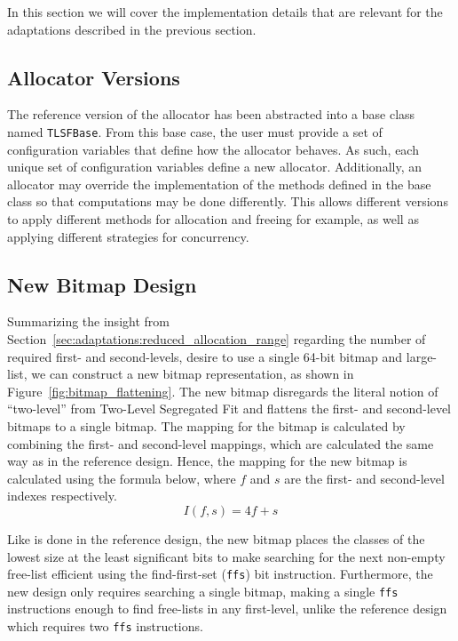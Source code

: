 
In this section we will cover the implementation details that are relevant for the adaptations described in the previous section.

\subsection{Allocator Versions}

The reference version of the allocator has been abstracted into a base class named \texttt{TLSFBase}. From this base case, the user must provide a set of configuration variables that define how the allocator behaves. As such, each unique set of configuration variables define a new allocator. Additionally, an allocator may override the implementation of the methods defined in the base class so that computations may be done differently. This allows different versions to apply different methods for allocation and freeing for example, as well as applying different strategies for concurrency.

\subsection{New Bitmap Design}

Summarizing the insight from Section~\ref{sec:adaptations:reduced_allocation_range} regarding the number of required first- and second-levels, desire to use a single 64-bit bitmap and large-list, we can construct a new bitmap representation, as shown in Figure~\ref{fig:bitmap_flattening}. The new bitmap disregards the literal notion of ``two-level'' from Two-Level Segregated Fit and flattens the first- and second-level bitmaps to a single bitmap. The mapping for the bitmap is calculated by combining the first- and second-level mappings, which are calculated the same way as in the reference design. Hence, the mapping for the new bitmap is calculated using the formula below, where $f$ and $s$ are the first- and second-level indexes respectively.
\[
    I(f, s) = 4f + s
\]

Like is done in the reference design, the new bitmap places the classes of the lowest size at the least significant bits to make searching for the next non-empty free-list efficient using the find-first-set (\texttt{ffs}) bit instruction. Furthermore, the new design only requires searching a single bitmap, making a single \texttt{ffs} instructions enough to find free-lists in any first-level, unlike the reference design which requires two \texttt{ffs} instructions.

